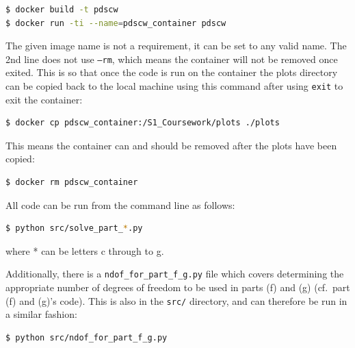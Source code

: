 \documentclass[12pt]{report} %
\begin{document}
\vspace*{1\baselineskip}
\begin{lstlisting}[language=bash, caption={Building the Docker image}]
$ docker build -t pdscw
$ docker run -ti --name=pdscw_container pdscw
\end{lstlisting}

The given image name is not a requirement, it can be set to any valid name. The 2nd line does not use \texttt{--rm}, which means the container will not be removed once exited. This is so that once the code is run on the container the plots directory can be copied back to the local machine using this command after using \texttt{exit} to exit the container:

\vspace*{1\baselineskip}
\begin{lstlisting}[language=bash, caption={Copying the plots directory back to the local machine}]
$ docker cp pdscw_container:/S1_Coursework/plots ./plots
\end{lstlisting}

This means the container can and should be removed after the plots have been copied:

\vspace*{1\baselineskip}
\begin{lstlisting}[language=bash, caption={Removing the container}]
$ docker rm pdscw_container
\end{lstlisting}

All code can be run from the command line as follows:

\vspace*{1\baselineskip}
\begin{lstlisting}[language=bash, caption={Running the code for each part}]
    $ python src/solve_part_*.py
\end{lstlisting}

where * can be letters c through to g.  

Additionally, there is a \texttt{ndof\_for\_part\_f\_g.py} file which covers determining the appropriate number of degrees of freedom to be used in parts (f) and (g) (cf.\ part (f) and (g)'s code). This is also in the \texttt{src/} directory, and can therefore be run in a similar fashion:  

\vspace*{1\baselineskip}
\begin{lstlisting}[language=bash, caption={Running the number of DoF fitting code}]
    $ python src/ndof_for_part_f_g.py
\end{lstlisting}
\end{document}
